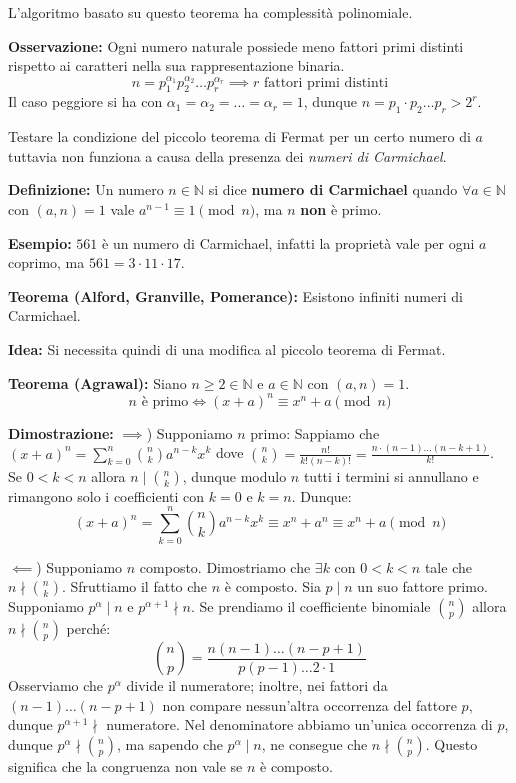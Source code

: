 L'algoritmo basato su questo teorema ha complessità polinomiale.

\vspace{0.4cm}
\textbf{Osservazione:} Ogni numero naturale possiede meno fattori primi distinti rispetto ai caratteri nella sua rappresentazione binaria.
$$n = p_1^{\alpha_1} p_2^{\alpha_2} \dots p_r^{\alpha_r} \implies r \text{ fattori primi distinti}$$
Il caso peggiore si ha con $\alpha_1 = \alpha_2 = \dots = \alpha_r = 1$, dunque $n = p_1 \cdot p_2 \dots p_r > 2^r$.

Testare la condizione del piccolo teorema di Fermat per un certo numero di $a$ tuttavia non funziona a causa della presenza dei \textit{numeri di Carmichael}.

\vspace{0.4cm}
\textbf{Definizione:} Un numero $n \in \mathbb{N}$ si dice \textbf{numero di Carmichael} quando $\forall a \in \mathbb{N}$ con $(a,n)=1$ vale $a^{n-1} \equiv 1 \pmod n$, ma $n$ \textbf{non} è primo.

\vspace{0.4cm}
\textbf{Esempio:} $561$ è un numero di Carmichael, infatti la proprietà vale per ogni $a$ coprimo, ma $561 = 3 \cdot 11 \cdot 17$.

\vspace{0.4cm}
\textbf{Teorema (Alford, Granville, Pomerance):} Esistono infiniti numeri di Carmichael.

\vspace{0.4cm}
\textbf{Idea:} Si necessita quindi di una modifica al piccolo teorema di Fermat.

\vspace{0.4cm}
\textbf{Teorema (Agrawal):} Siano $n \ge 2 \in \mathbb{N}$ e $a \in \mathbb{N}$ con $(a,n)=1$. 
$$ n \text{ è primo} \iff (x+a)^n \equiv x^n + a \pmod n $$

\textbf{Dimostrazione:}
$\implies$) Supponiamo $n$ primo: 
Sappiamo che $(x+a)^n = \sum_{k=0}^{n} \binom{n}{k} a^{n-k} x^k$ dove $\binom{n}{k} = \frac{n!}{k!(n-k)!} = \frac{n \cdot (n-1) \dots (n-k+1)}{k!}$. 
Se $0 < k < n$ allora $n \mid \binom{n}{k}$, dunque modulo $n$ tutti i termini si annullano e rimangono solo i coefficienti con $k=0$ e $k=n$. Dunque:
$$(x+a)^n = \sum_{k=0}^{n} \binom{n}{k} a^{n-k} x^k \equiv x^n + a^n \equiv x^n + a \pmod n$$

$\impliedby$) Supponiamo $n$ composto. Dimostriamo che $\exists k$ con $0 < k < n$ tale che $n \nmid \binom{n}{k}$. 
Sfruttiamo il fatto che $n$ è composto. Sia $p \mid n$ un suo fattore primo. Supponiamo $p^\alpha \mid n$ e $p^{\alpha+1} \nmid n$. Se prendiamo il coefficiente binomiale $\binom{n}{p}$ allora $n \nmid \binom{n}{p}$ perché:
$$\binom{n}{p} = \frac{n(n-1)\dots(n-p+1)}{p(p-1)\dots 2 \cdot 1}$$
Osserviamo che $p^\alpha$ divide il numeratore; inoltre, nei fattori da $(n-1) \dots (n-p+1)$ non compare nessun'altra occorrenza del fattore $p$, dunque $p^{\alpha+1} \nmid$ numeratore.
Nel denominatore abbiamo un'unica occorrenza di $p$, dunque $p^\alpha \nmid \binom{n}{p}$, ma sapendo che $p^\alpha \mid n$, ne consegue che $n \nmid \binom{n}{p}$.
Questo significa che la congruenza non vale se $n$ è composto.

